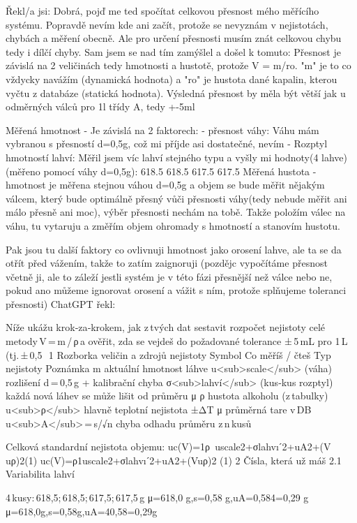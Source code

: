 Řekl/a jsi:
Dobrá, pojď me ted spočítat celkovou přesnost mého měřícího systému. Popravdě nevím kde ani začít, protože se nevyznám v nejistotách, chybách a měření obecně. Ale pro určení přesnosti musím znát celkovou chybu tedy i dílčí chyby. Sam jsem se nad tím zamýšlel a došel k tomuto: Přesnost je závislá na 2 veličinách tedy hmotnosti a hustotě, protože V = m/ro. "m" je to co vždycky navážím (dynamická hodnota) a "ro" je hustota dané kapalin, kterou vyčtu z databáze (statická hodnota). Výsledná přesnost by měla být větší jak u odměrných válců pro 1l třídy A, tedy +-5ml

Měřená hmotnost - Je závislá na 2 faktorech: 
	- přesnost váhy: Váhu mám vybranou s přesností d=0,5g, což mi příjde asi dostatečné, nevím
	- Rozptyl hmotností lahví: Měřil jsem víc lahví stejného typu a vyšly mi hodnoty(4 lahve)(měřeno pomocí váhy d=0,5g): 
	618.5
	618.5
	617.5
	617.5
Měřená hustota - hmotnost je měřena stejnou váhou d=0,5g a objem se bude měřit nějakým válcem, který bude optimálně přesný vůči přesnosti váhy(tedy nebude měřit ani málo přesně ani moc), výběr přesnosti nechám na tobě. Takže položím válec na váhu, tu vytaruju a změřím objem ohromady s hmotností a stanovím hustotu.

Pak jsou tu další faktory co ovlivnuji hmotnost jako orosení lahve, ale ta se da otřít před vážením, takže to zatím zaignoruji (pozdějc vypočítáme přesnost včetně ji, ale to záleží jestli systém je v této fázi přesnější než válce nebo ne, pokud ano můžeme ignorovat orosení a vážit s ním, protože splňujeme toleranci přesnosti)
ChatGPT řekl:

Níže ukážu krok‑za‑krokem, jak z tvých dat sestavit rozpočet nejistoty celé metody V = m / ρ a ověřit, zda se vejdeš do požadované tolerance ± 5 mL pro 1 L (tj. ± 0,5  %
1  Rozborka veličin a zdrojů nejistoty
Symbol	Co měříš / čteš	Typ nejistoty	Poznámka
m	aktuální hmotnost láhve	u<sub>scale</sub> (váha)	rozlišení d = 0,5 g + kalibrační chyba
		σ<sub>lahví</sub> (kus‑kus rozptyl)	každá nová láhev se může lišit od průměru μ
ρ	hustota alkoholu (z tabulky)	u<sub>ρ</sub>	hlavně teplotní nejistota ±ΔT
μ	průměrná tare v DB	u<sub>A</sub> = s/√n	chyba odhadu průměru z n kusů

Celková standardní nejistota objemu:
uc(V)=1ρ   uscale2+σlahvıˊ2+uA2+(V uρ)2(1)
uc​(V)=ρ1​uscale2​+σlahvıˊ2​+uA2​+(Vuρ​)2
​(1)
2  Čísla, která už máš
2.1  Variabilita lahví

4 kusy: 618,5; 618,5; 617,5; 617,5 g
μ=618,0  g,s=0,58  g,uA=0,584=0,29  g
μ=618,0g,s=0,58g,uA​=4
​0,58​=0,29g


